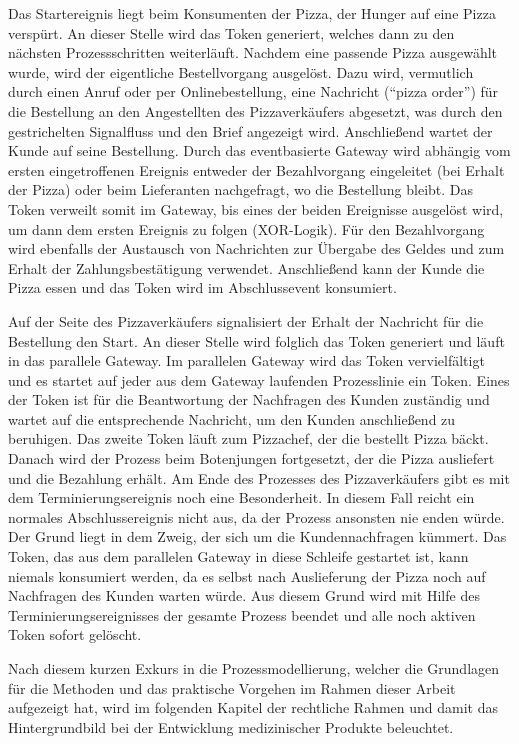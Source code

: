 \documentclass[a4paper,12pt]{report}
\begin{document}
Das Startereignis liegt beim Konsumenten der Pizza, der Hunger auf eine Pizza verspürt. An dieser Stelle wird das Token generiert, welches dann zu den nächsten Prozessschritten weiterläuft. Nachdem eine passende Pizza ausgewählt wurde, wird der eigentliche Bestellvorgang ausgelöst. Dazu wird, vermutlich durch einen Anruf oder per Onlinebestellung, eine Nachricht ("`pizza order"') für die Bestellung an den Angestellten des Pizzaverkäufers abgesetzt, was durch den gestrichelten Signalfluss und den Brief angezeigt wird. Anschließend wartet der Kunde auf seine Bestellung. Durch das eventbasierte Gateway wird abhängig vom ersten eingetroffenen Ereignis entweder der Bezahlvorgang eingeleitet (bei Erhalt der Pizza) oder beim Lieferanten nachgefragt, wo die Bestellung bleibt. Das Token verweilt somit im Gateway, bis eines der beiden Ereignisse ausgelöst wird, um dann dem ersten Ereignis zu folgen (XOR-Logik). Für den Bezahlvorgang wird ebenfalls der Austausch von Nachrichten zur Übergabe des Geldes und zum Erhalt der Zahlungsbestätigung verwendet. Anschließend kann der Kunde die Pizza essen und das Token wird im Abschlussevent konsumiert.

Auf der Seite des Pizzaverkäufers signalisiert der Erhalt der Nachricht für die Bestellung den Start. An dieser Stelle wird folglich das Token generiert und läuft in das parallele Gateway. Im parallelen Gateway wird das Token vervielfältigt und es startet auf jeder aus dem Gateway laufenden Prozesslinie ein Token. Eines der Token ist für die Beantwortung der Nachfragen des Kunden zuständig und wartet auf die entsprechende Nachricht, um den Kunden anschließend zu beruhigen. Das zweite Token läuft zum Pizzachef, der die bestellt Pizza bäckt. Danach wird der Prozess beim Botenjungen fortgesetzt, der die Pizza ausliefert und die Bezahlung erhält. Am Ende des Prozesses des Pizzaverkäufers gibt es mit dem Terminierungsereignis noch eine Besonderheit. In diesem Fall reicht ein normales Abschlussereignis nicht aus, da der Prozess ansonsten nie enden würde. Der Grund liegt in dem Zweig, der sich um die Kundennachfragen kümmert. Das Token, das aus dem parallelen Gateway in diese Schleife gestartet ist, kann niemals konsumiert werden, da es selbst nach Auslieferung der Pizza noch auf Nachfragen des Kunden warten würde. Aus diesem Grund wird mit Hilfe des Terminierungsereignisses der gesamte Prozess beendet und alle noch aktiven Token sofort gelöscht.

Nach diesem kurzen Exkurs in die Prozessmodellierung, welcher die Grundlagen für die Methoden und das praktische Vorgehen im Rahmen dieser Arbeit aufgezeigt hat, wird im folgenden Kapitel der rechtliche Rahmen und damit das Hintergrundbild bei der Entwicklung medizinischer Produkte beleuchtet.
\end{document}
